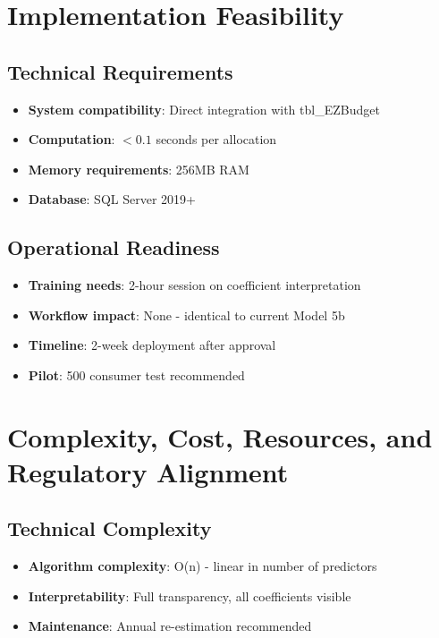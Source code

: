 \section{Implementation Feasibility}

\subsection{Technical Requirements}

\begin{itemize}
    \item \textbf{System compatibility}: Direct integration with tbl\_EZBudget
    \item \textbf{Computation}: $< 0.1$ seconds per allocation
    \item \textbf{Memory requirements}: 256MB RAM
    \item \textbf{Database}: SQL Server 2019+
\end{itemize}

\subsection{Operational Readiness}

\begin{itemize}
    \item \textbf{Training needs}: 2-hour session on coefficient interpretation
    \item \textbf{Workflow impact}: None - identical to current Model 5b
    \item \textbf{Timeline}: 2-week deployment after approval
    \item \textbf{Pilot}: 500 consumer test recommended
\end{itemize}

\section{Complexity, Cost, Resources, and Regulatory Alignment}

\subsection{Technical Complexity}

\begin{itemize}
    \item \textbf{Algorithm complexity}: O(n) - linear in number of predictors
    \item \textbf{Interpretability}: Full transparency, all coefficients visible
    \item \textbf{Maintenance}: Annual re-estimation recommended
\end{itemize}

